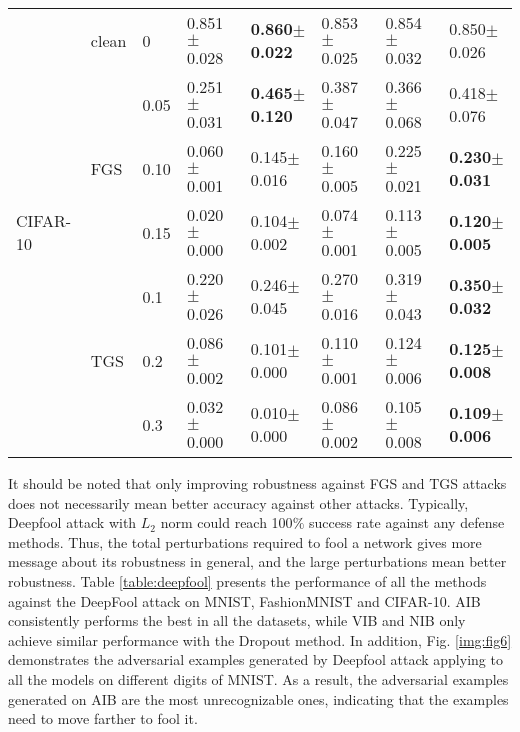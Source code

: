 \documentclass[10pt,journal,compsoc]{IEEEtran}
\begin{document}
\begin{table*}[]
{\begin{tabular}{clllllll}
\multicolumn{1}{l}{\multirow{7}{*}{CIFAR-10}} & clean                & 0            & 0.851$\pm$0.028  & \textbf{0.860}$\pm$\textbf{0.022}   & 0.853$\pm$0.025 & 0.854$\pm$0.032 & 0.850$\pm$0.026 \\
                                              & \multirow{3}{*}{FGS} & 0.05         & 0.251$\pm$0.031  & \textbf{0.465}$\pm$\textbf{0.120}   & 0.387$\pm$0.047 & 0.366$\pm$0.068 & 0.418$\pm$0.076 \\
                                              &                      & 0.10         & 0.060$\pm$0.001  & 0.145$\pm$0.016   & 0.160$\pm$0.005 & 0.225$\pm$0.021 & \textbf{0.230}$\pm$\textbf{0.031} \\
                                              &                      & 0.15         & 0.020$\pm$0.000  & 0.104$\pm$0.002   & 0.074$\pm$0.001 & 0.113$\pm$0.005 & \textbf{0.120}$\pm$\textbf{0.005} \\
                                              & \multirow{3}{*}{TGS} & 0.1          & 0.220$\pm$0.026  & 0.246$\pm$0.045   & 0.270$\pm$0.016 & 0.319$\pm$0.043 & \textbf{0.350}$\pm$\textbf{0.032} \\
                                              &                      & 0.2          & 0.086$\pm$0.002  & 0.101$\pm$0.000   & 0.110$\pm$0.001 & 0.124$\pm$0.006 & \textbf{0.125}$\pm$\textbf{0.008} \\
                                              &                      & 0.3          & 0.032$\pm$0.000  & 0.010$\pm$0.000   & 0.086$\pm$0.002 & 0.105$\pm$0.008 & \textbf{0.109}$\pm$\textbf{0.006}               \\
\bottomrule[1pt]
\end{tabular}}\label{table:fgs}
\end{table*}


It should be noted that only improving robustness against FGS and TGS attacks does not necessarily mean better accuracy against other attacks. Typically, Deepfool attack with $L_2$ norm could reach 100$\%$ success rate against any defense methods. Thus, the total perturbations required to fool a network gives more message about its robustness in general, and the large perturbations mean better robustness.
Table \ref{table:deepfool} presents the performance of all the methods against the DeepFool attack on MNIST, FashionMNIST and CIFAR-10. AIB consistently performs the best in all the datasets, while VIB and NIB only achieve similar performance with the Dropout method. In addition, Fig. \ref{img:fig6} demonstrates the adversarial examples generated by Deepfool attack applying to all the models on different digits of MNIST. As a result, the adversarial examples generated on AIB are the most unrecognizable ones, indicating that the examples need to move farther to fool it.
\end{document}
